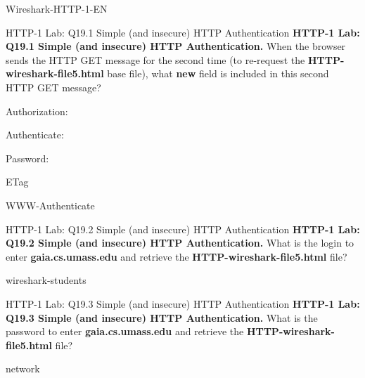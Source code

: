 \documentclass[a4paper]{article}
\begin{document}
\begin{quiz}{Wireshark-HTTP-1-EN}
\begin{multi}[points=1,shuffle]{HTTP-1 Lab: Q19.1 Simple (and insecure) HTTP Authentication}
\textbf{HTTP-1 Lab: Q19.1 Simple (and insecure) HTTP Authentication.} 
When the browser sends the HTTP GET message for the second time (to re-request the \textbf{HTTP-wireshark-file5.html} base file), what \textbf{new} field is included in this second HTTP GET message?   
\item* Authorization:
\item Authenticate:
\item Password:
\item ETag
\item WWW-Authenticate
\end{multi}

\begin{shortanswer}[points=1]{HTTP-1 Lab: Q19.2 Simple (and insecure) HTTP Authentication}
\textbf{HTTP-1 Lab: Q19.2 Simple (and insecure) HTTP Authentication.} 
What is the login to enter \textbf{gaia.cs.umass.edu} and retrieve the \textbf{HTTP-wireshark-file5.html} file?
\item wireshark-students
\end{shortanswer}

\begin{shortanswer}[points=1,shuffle]{HTTP-1 Lab: Q19.3 Simple (and insecure) HTTP Authentication}
\textbf{HTTP-1 Lab: Q19.3 Simple (and insecure) HTTP Authentication.} 
What is the password to enter \textbf{gaia.cs.umass.edu} and retrieve the \textbf{HTTP-wireshark-file5.html} file?
\item network
\end{shortanswer}

\end{quiz}
\end{document}
